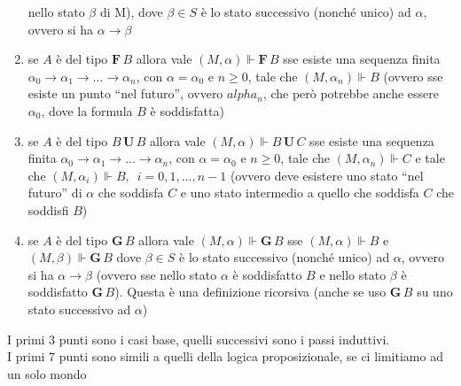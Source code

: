 \documentclass[a4paper,12pt, oneside]{book}
\begin{document}
\begin{definizione}
\begin{enumerate}
    nello stato $\beta$ di M), dove $\beta\in S$ è lo stato
    successivo (nonché unico) ad $\alpha$, ovvero si ha $\alpha\to\beta$
    \item se $A$ è del tipo $\mathbf{F}\,B$ allora vale $(M,\alpha)\Vdash
    \mathbf{F}\,B$ sse esiste una sequenza finita
    $\alpha_0\to\alpha_1\to\ldots\to\alpha_n$, con $\alpha=\alpha_0$ e $n\geq
    0$, tale che $(M,\alpha_n)\Vdash B$ (ovvero sse esiste un punto ``nel
    futuro'', ovvero $alpha_n$, che però potrebbe anche essere $\alpha_0$, dove
    la formula $B$ è soddisfatta)
    \item se $A$ è del tipo $B\,\mathbf{U}\,B$ allora vale $(M,\alpha)\Vdash
    B\,\mathbf{U}\,C$ sse esiste una sequenza finita
    $\alpha_0\to\alpha_1\to\ldots\to\alpha_n$, con $\alpha=\alpha_0$ e $n\geq
    0$, tale che $(M,\alpha_n)\Vdash C$ e tale che $(M,\alpha_i)\Vdash
    B,\,\,\,i=0,1,\ldots,n-1$ (ovvero deve esistere uno stato ``nel futuro'' di
    $\alpha$ che soddisfa $C$ e uno stato intermedio a quello che soddisfa $C$
    che soddisfi $B$) 
    \item se $A$ è del tipo $\mathbf{G}\,B$ allora vale $(M,\alpha)\Vdash
    \mathbf{G}\,B$ sse $(M,\alpha)\Vdash B$ e $(M,\beta)\Vdash \mathbf{G}\,B$
    dove $\beta\in S$ è lo stato successivo (nonché unico) ad $\alpha$, ovvero
    si ha $\alpha\to\beta$ (ovvero sse nello stato $\alpha$ è soddisfatto $B$ e
    nello stato $\beta$ è soddisfatto $\mathbf{G}\,B$). Questa è una definizione
    ricorsiva (anche se uso $\mathbf{G}\,B$ su uno stato successivo ad
    $\alpha$)
  \end{enumerate}
  I primi 3 punti sono i casi base, quelli successivi sono i passi induttivi.\\
  I primi 7 punti sono simili a quelli della logica proposizionale, se ci
  limitiamo ad un solo mondo
\end{definizione}
\end{document}
